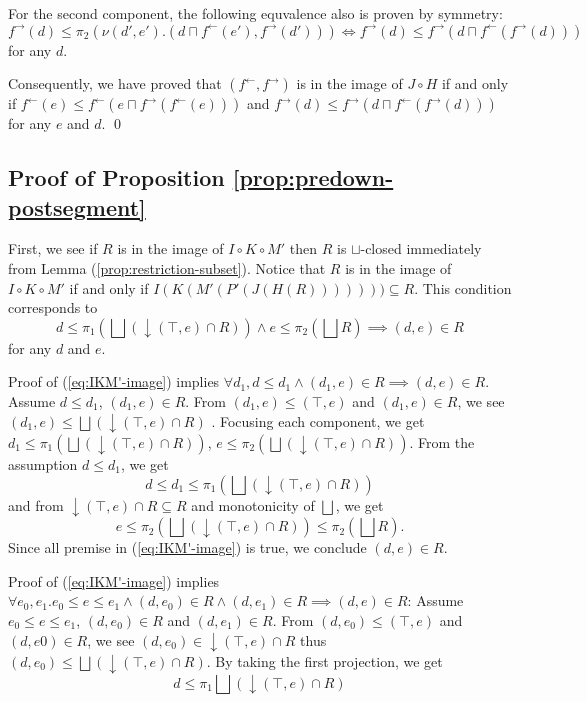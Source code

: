 \documentclass{llncs}
\newcommand{\ff}{{f^{\rightarrow}}}
\newcommand{\fb}{{f^{\leftarrow}}}
\newcommand{\join}{\sqcup}
\newcommand{\bigjoin}{\bigsqcup}
\newcommand{\meet}{\sqcap}
\newcommand{\comp}{\circ}
\begin{document}
For the second component, the following equvalence also is proven by symmetry:
\[
  \ff(d) \leq \pi_{2} (\nu (d',e').(d \meet \fb(e') , \ff(d'))) \iff \ff(d) \leq \ff(d \meet \fb (\ff(d)))
\] for any $d$.

Consequently, we have proved that $(\fb, \ff)$ is in the image of $J \comp H$ if and only if
$\fb(e) \leq \fb(e \meet \ff (\fb(e)))$ and $\ff(d) \leq \ff(d \meet \fb (\ff(d)))$ for any $e$ and $d$. \qed

\subsection{Proof of Proposition \ref{prop:predown-postsegment}}
First, we see if $R$ is in the image of $I \comp K \comp M'$ then $R$ is $\join$-closed immediately from Lemma (\ref{prop:restriction-subset}).
Notice that $R$ is in the image of $I \comp K \comp M'$ if and only if $I(K(M'(P'(J(H(R))))))) \subseteq R$. This condition corresponds to
\begin{equation}\label{eq:IKM'-image}
  d \leq \pi_{1} (\bigjoin(\downarrow (\top , e) \cap R)) \land e \leq \pi_{2} (\bigjoin R) \implies (d, e) \in R
\end{equation}
for any $d$ and $e$.

Proof of (\ref{eq:IKM'-image}) implies $\forall d_{1} , d \leq d_{1} \land (d_{1} , e) \in R \implies (d , e) \in R$.
Assume $d \leq d_1$, $(d_1, e) \in R$. From $(d_{1} , e) \leq (\top , e)$ and $(d_{1} , e) \in R$, we see $(d_{1} , e) \leq \bigjoin (\downarrow (\top , e) \cap R)$ . Focusing each component, we get $d_{1} \leq \pi_{1} (\bigjoin (\downarrow (\top , e) \cap R))$, $e \leq \pi_{2} (\bigjoin (\downarrow (\top , e) \cap R))$. From the assumption $d \leq d_{1}$, we get
\[
  d \leq d_{1} \leq \pi_{1} (\bigjoin (\downarrow (\top , e) \cap R))
\] and from $\downarrow (\top , e) \cap R \subseteq R$ and monotonicity of $\bigjoin$, we get
\[
  e \leq  \pi_{2} (\bigjoin (\downarrow (\top , e) \cap R)) \leq \pi_{2} (\bigjoin R).
\] Since all premise in (\ref{eq:IKM'-image}) is true, we conclude $(d, e) \in R$.

Proof of (\ref{eq:IKM'-image}) implies $\forall e_{0}, e_{1}. e_{0} \leq e \leq e_{1} \land (d , e_{0}) \in R \land (d , e_{1}) \in R \implies (d , e) \in R$:
Assume $e_{0} \leq e \leq e_{1}$, $(d , e_{0}) \in R$ and $(d, e_{1}) \in R$.
From $(d , e_{0}) \leq (\top , e)$ and $(d, e{0}) \in R$, we see $(d , e_{0}) \in \downarrow (\top , e) \cap R$ thus $(d , e_{0}) \leq \bigjoin (\downarrow (\top , e) \cap R)$. By taking the first projection, we get
\[ d \leq \pi_{1} \bigjoin (\downarrow (\top , e) \cap R) \]
\end{document}
